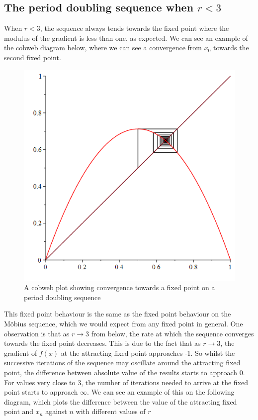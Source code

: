 \documentclass[12pt]{article}
\begin{document}
\subsection{The period doubling sequence when $r<3$}
When $r<3$, the sequence always tends towards the fixed point where the modulus of the gradient is less than one, as expected. We can see an example of the cobweb diagram below, where we can see a convergence from $x_0$ towards the second fixed point.
\begin{figure}[H]
	\centering
	\includegraphics[scale=0.4]{perCob2p85.png}
	\caption{A cobweb plot showing convergence towards a fixed point on a period doubling sequence}
	\label{fig:percob2p85}
\end{figure}
This fixed point behaviour is the same as the fixed point behaviour on the Möbius sequence, which we would expect from any fixed point in general. One observation is that as $r\to3$ from below, the rate at which the sequence converges towards the fixed point decreases. This is due to the fact that as $r\to3$, the gradient of $f(x)$ at the attracting fixed point approaches -1. So whilst the successive iterations of the sequence may oscillate around the attracting fixed point, the difference between absolute value of the results starts to approach 0. For values very close to 3, the number of iterations needed to arrive at the fixed point starts to approach $\infty$. We can see an example of this on the following diagram, which plots the difference between the value of the attracting fixed point and $x_n$ against $n$ with different values of $r$
\end{document}
